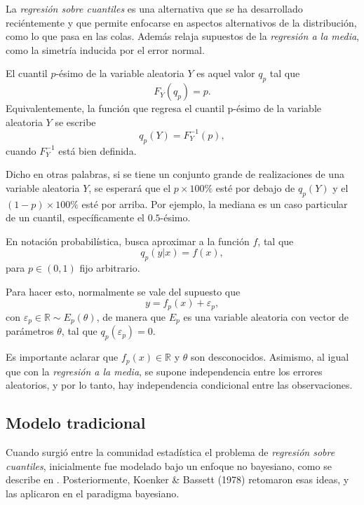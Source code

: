 La \textit{regresi\'on sobre cuantiles} es una alternativa que se ha desarrollado reci\'entemente y que permite enfocarse en aspectos alternativos de la distribuci\'on, como lo que pasa en las colas. Adem\'as relaja supuestos de la \textit{regresi\'on a la media}, como la simetr\'ia inducida por el error normal.

\begin{defin}
El cuantil $p$-\'esimo de la variable aleatoria $Y$ es aquel valor $q_p$ tal que
\begin{equation*}
    F_Y(q_p) = p.
\end{equation*}
Equivalentemente, la funci\'on que regresa el cuantil p-\'esimo de la variable aleatoria $Y$ se escribe
\begin{equation*}
    q_p(Y) = F_Y^{-1}(p),
\end{equation*}
cuando $F_Y^{-1}$ est\'a bien definida.
\end{defin}
Dicho en otras palabras, si se tiene un conjunto grande de realizaciones de una variable aleatoria $Y$, se esperar\'a que el $p \times 100\%$ est\'e por debajo de $q_p(Y)$ y el $(1-p) \times 100\%$ est\'e por arriba. Por ejemplo, la mediana es un caso particular de un cuantil, espec\'ificamente el $0.5$-\'esimo. 

En notaci\'on probabil\'istica, busca aproximar a la funci\'on $f$, tal que 
\begin{equation*}
    q_p(y|x) = f(x),
\end{equation*}
para $p \in (0,1)$ fijo arbitrario.

Para hacer esto, normalmente se vale del supuesto que
\begin{equation*}
    y = f_p(x) + \varepsilon_p,
\end{equation*}
con $\varepsilon_p \in \mathbb{R} \sim E_p(\theta)$, de manera que $E_p$ es una variable aleatoria con vector de par\'ametros $\theta$, tal que $q_p(\varepsilon_p) = 0$. 

Es importante aclarar que $f_p(x) \in \mathbb{R}$ y $\theta$ son desconocidos. Asimismo, al igual que con la \textit{regresi\'on a la media}, se supone independencia entre los errores aleatorios, y por lo tanto, hay independencia condicional entre las observaciones.

\subsection{Modelo tradicional}

Cuando surgi\'o entre la comunidad estad\'istica el problema de \textit{regresi\'on sobre cuantiles}, inicialmente fue modelado bajo un enfoque no bayesiano, como se describe en \cite{Yu_BayQuantReg}.  Posteriormente, Koenker \& Bassett (1978) retomaron esas ideas, y las aplicaron en el paradigma bayesiano. 

